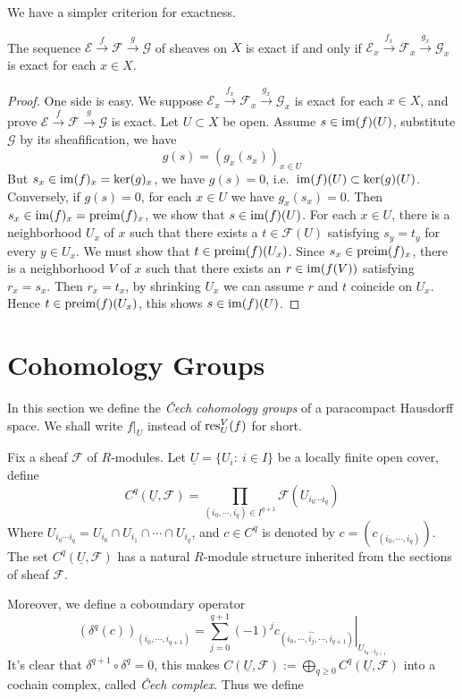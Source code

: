 We have a simpler criterion for exactness.
\begin{prop}\label{exactness of sheaves}
    The sequence $\mathcal{E}\xrightarrow{f}\mathcal{F}\xrightarrow{g}\mathcal{G}$ of sheaves on $X$ is exact if and only if $\mathcal{E}_x\xrightarrow{f_x}\mathcal{F}_x\xrightarrow{g_x}\mathcal{G}_x$ is exact for each $x\in X$.
\end{prop}
\begin{proof}
    One side is easy.
    We suppose $\mathcal{E}_x\xrightarrow{f_x}\mathcal{F}_x\xrightarrow{g_x}\mathcal{G}_x$ is exact for each $x\in X$, and prove $\mathcal{E}\xrightarrow{f}\mathcal{F}\xrightarrow{g}\mathcal{G}$ is exact.
    Let $U\subset X$ be open.
    Assume $s\in\operatorname{im}(f)(U)$, substitute $\mathcal{G}$ by its sheafification, we have
    \[g(s)=(g_x(s_x))_{x\in U}\]
    But $s_x\in\operatorname{im}(f)_x=\ker(g)_x$, we have $g(s)=0$, i.e.\ $\operatorname{im}(f)(U)\subset\ker(g)(U)$.
    Conversely, if $g(s)=0$, for each $x\in U$ we have $g_x(s_x)=0$.
    Then $s_x\in\operatorname{im}(f)_x=\operatorname{preim}(f)_x$, we show that $s\in\operatorname{im}(f)(U)$.
    For each $x\in U$, there is a neighborhood $U_x$ of $x$ such that there exists a $t\in\mathcal{F}(U)$ satisfying $s_y=t_y$ for every $y\in U_x$.
    We must show that $t\in\operatorname{preim}(f)(U_x)$.
    Since $s_x\in\operatorname{preim}(f)_x$, there is a neighborhood $V$ of $x$ such that there exists an $r\in\operatorname{im}(f(V))$ satisfying $r_x=s_x$.
    Then $r_x=t_x$, by shrinking $U_x$ we can assume $r$ and $t$ coincide on $U_x$.
    Hence $t\in\operatorname{preim}(f)(U_x)$, this shows $s\in\operatorname{im}(f)(U)$.
\end{proof}

\section{Cohomology Groups}

In this section we define the \emph{\v{C}ech cohomology groups} of a paracompact Hausdorff space.
We shall write $f|_U$ instead of $\operatorname{res}^V_U(f)$ for short.

Fix a sheaf $\mathcal{F}$ of $R$-modules.
Let $\underline{U}=\{U_i:\ i\in I\}$ be a locally finite open cover, define
\[C^q(\underline{U},\mathcal{F})=\prod_{(i_0,\cdots,i_q)\in I^{q+1}}\mathcal{F}(U_{i_0\cdots i_q})\]
Where $U_{i_0\cdots i_q}=U_{i_0}\cap U_{i_1}\cap\cdots\cap U_{i_q}$, and $c\in C^q$ is denoted by $c=\left(c_{(i_0,\cdots,i_q)}\right)$.
The set $C^q(\underline{U},\mathcal{F})$ has a natural $R$-module structure inherited from the sections of sheaf $\mathcal{F}$.

Moreover, we define a coboundary operator
\[(\delta^q(c))_{(i_0,\cdots,i_{q+1})}=\sum_{j=0}^{q+1}(-1)^j\left.c_{(i_0,\cdots,\widehat{i_j},\cdots,i_{q+1})}\right|_{U_{i_0\cdots i_{q+1}}}\]
It's clear that $\delta^{q+1}\circ\delta^q=0$, this makes $C(\underline{U},\mathcal{F}):=\bigoplus_{q\geq 0}C^q(\underline{U},\mathcal{F})$ into a cochain complex, called \emph{\v{C}ech complex}.
Thus we define

